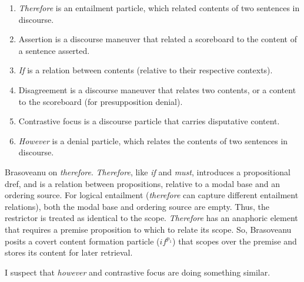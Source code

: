 \documentclass[letterpaper,10pt]{article}
\begin{document}
\begin{enumerate}
  \item \textit{Therefore} is an entailment particle, which related contents of two sentences in discourse.
  \item Assertion is a discourse maneuver that related a scoreboard to the content of a sentence asserted.
  \item \textit{If} is a relation between contents (relative to their respective contexts).
  \item Disagreement is a discourse maneuver that relates two contents, or a content to the scoreboard (for presupposition denial).
  \item Contrastive focus is a discourse particle that carries disputative content.
  \item \textit{However} is a denial particle, which relates the contents of two sentences in discourse.
\end{enumerate}

Brasoveanu on \textit{therefore}.  \textit{Therefore}, like \textit{if} and \textit{must}, introduces a propositional dref, and is a relation between propositions, relative to a modal base and an ordering source.  For logical entailment (\textit{therefore} can capture different entailment relations), both the modal base and ordering source are empty.  Thus, the restrictor is treated as identical to the scope.  \textit{Therefore} has an anaphoric element that requires a premise proposition to which to relate its scope.  So, Brasoveanu posits a covert content formation particle ($if^{p_1}$) that scopes over the premise and stores its content for later retrieval.

I suspect that \textit{however} and contrastive focus are doing something similar.
\end{document}
